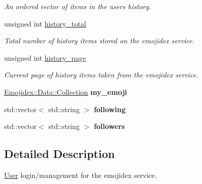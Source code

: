 \begin{DoxyCompactItemize}
\begin{DoxyCompactList}\small\item\em An ordered vector of items in the users history. \end{DoxyCompactList}\item 
unsigned int \hyperlink{classEmojidex_1_1Service_1_1User_a5a7b4e141fdf8a9aaddfcce3394b12db}{history\+\_\+total}\hypertarget{classEmojidex_1_1Service_1_1User_a5a7b4e141fdf8a9aaddfcce3394b12db}{}\label{classEmojidex_1_1Service_1_1User_a5a7b4e141fdf8a9aaddfcce3394b12db}

\begin{DoxyCompactList}\small\item\em Total number of history items stored on the emojidex service. \end{DoxyCompactList}\item 
unsigned int \hyperlink{classEmojidex_1_1Service_1_1User_ab938b61c56121dbf590aa08d96556cd0}{history\+\_\+page}\hypertarget{classEmojidex_1_1Service_1_1User_ab938b61c56121dbf590aa08d96556cd0}{}\label{classEmojidex_1_1Service_1_1User_ab938b61c56121dbf590aa08d96556cd0}

\begin{DoxyCompactList}\small\item\em Current page of history items taken from the emojidex service. \end{DoxyCompactList}\item 
\hyperlink{classEmojidex_1_1Data_1_1Collection}{Emojidex\+::\+Data\+::\+Collection} {\bfseries my\+\_\+emoji}\hypertarget{classEmojidex_1_1Service_1_1User_aa4b1decc97e13a92ba6830ccf2176f09}{}\label{classEmojidex_1_1Service_1_1User_aa4b1decc97e13a92ba6830ccf2176f09}

\item 
std\+::vector$<$ std\+::string $>$ {\bfseries following}\hypertarget{classEmojidex_1_1Service_1_1User_a48fb02c42de30f7b901f41fd74117839}{}\label{classEmojidex_1_1Service_1_1User_a48fb02c42de30f7b901f41fd74117839}

\item 
std\+::vector$<$ std\+::string $>$ {\bfseries followers}\hypertarget{classEmojidex_1_1Service_1_1User_a89bd503730e389734980d45c978c6612}{}\label{classEmojidex_1_1Service_1_1User_a89bd503730e389734980d45c978c6612}

\end{DoxyCompactItemize}


\subsection{Detailed Description}
\hyperlink{classEmojidex_1_1Service_1_1User}{User} login/management for the emojidex service. 

